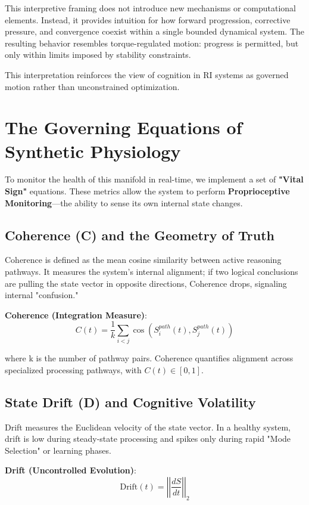 \documentclass[12pt,a4paper]{report}
\newcommand{\inU}{\in}
\begin{document}
This interpretive framing does not introduce new mechanisms or computational elements. Instead, it provides intuition for how forward progression, corrective pressure, and convergence coexist within a single bounded dynamical system. The resulting behavior resembles torque-regulated motion: progress is permitted, but only within limits imposed by stability constraints.

This interpretation reinforces the view of cognition in RI systems as governed motion rather than unconstrained optimization.

\section{The Governing Equations of Synthetic Physiology}

To monitor the health of this manifold in real-time, we implement a set of \textbf{"Vital Sign"} equations. These metrics allow the system to perform \textbf{Proprioceptive Monitoring}—the ability to sense its own internal state changes.

\subsection{Coherence (C) and the Geometry of Truth}

Coherence is defined as the mean cosine similarity between active reasoning pathways. It measures the system's internal alignment; if two logical conclusions are pulling the state vector in opposite directions, Coherence drops, signaling internal "confusion."

\textbf{Coherence (Integration Measure)}:
\[C(t) = \frac{1}{k} \sum_{i < j} \cos(S_i^{path}(t), S_j^{path}(t))\]

where k is the number of pathway pairs. Coherence quantifies alignment across specialized processing pathways, with $C(t) \inU [0, 1]$.

\subsection{State Drift (D) and Cognitive Volatility}

Drift measures the Euclidean velocity of the state vector. In a healthy system, drift is low during steady-state processing and spikes only during rapid "Mode Selection" or learning phases.

\textbf{Drift (Uncontrolled Evolution)}:
\[\text{Drift}(t) = \left|\left|\frac{dS}{dt}\right|\right|_2\]
\end{document}

